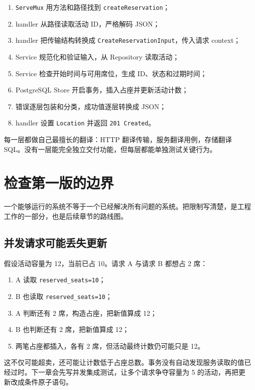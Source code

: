 \begin{enumerate}
  \item \texttt{ServeMux} 用方法和路径找到 \texttt{createReservation}；
  \item handler 从路径读取活动 ID，严格解码 JSON；
  \item handler 把传输结构转换成 \texttt{CreateReservationInput}，传入请求 context；
  \item Service 规范化和验证输入，从 Repository 读取活动；
  \item Service 检查开始时间与可用席位，生成 ID、状态和过期时间；
  \item PostgreSQL Store 开启事务，插入占座并更新活动计数；
  \item 错误逐层包装和分类，成功值逐层转换成 JSON；
  \item handler 设置 \texttt{Location} 并返回 \texttt{201 Created}。
\end{enumerate}

每一层都做自己最擅长的翻译：HTTP 翻译传输，服务翻译用例，存储翻译 SQL。没有一层能完全独立交付功能，但每层都能单独测试关键行为。

\section{检查第一版的边界}

一个能够运行的系统不等于一个已经解决所有问题的系统。把限制写清楚，是工程工作的一部分，也是后续章节的路线图。

\subsection{并发请求可能丢失更新}

假设活动容量为 12，当前已占 10。请求 A 与请求 B 都想占 2 席：

\begin{enumerate}
  \item A 读取 \texttt{reserved\_seats=10}；
  \item B 也读取 \texttt{reserved\_seats=10}；
  \item A 判断还有 2 席，构造占座，把新值算成 12；
  \item B 也判断还有 2 席，把新值算成 12；
  \item 两笔占座都插入，各有 2 席，但活动最终计数仍可能只是 12。
\end{enumerate}

这不仅可能超卖，还可能让计数低于占座总数。事务没有自动发现服务读取的值已经过时。下一章会先写并发集成测试，让多个请求争夺容量为 5 的活动，再把更新改成条件原子语句。

